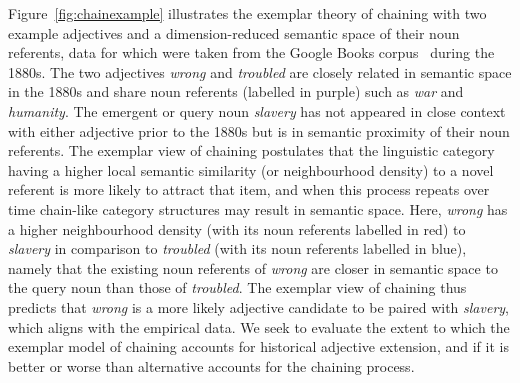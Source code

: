 \documentclass[output=paper]{langsci/langscibook}
\begin{document}
Figure~\ref{fig:chainexample} illustrates the exemplar theory of chaining with two example adjectives and a dimension-reduced semantic space of their noun referents, data for which were taken from the Google Books corpus~\citep{michel2011quantitative} during the 1880s. The two adjectives \textit{wrong} and \textit{troubled} are closely related in semantic space in the 1880s and share noun referents (labelled in purple) such as \textit{war} and \textit{humanity}. The emergent or query noun \textit{slavery} has not appeared in close context with either adjective prior to the 1880s but is in semantic proximity of their noun referents. The exemplar view of chaining postulates that the linguistic category having a higher local semantic similarity (or neighbourhood density) to a novel referent is more likely to attract that item, and when this process repeats over time chain-like category structures may result in semantic space. Here, \textit{wrong} has a higher neighbourhood density (with its noun referents labelled in red) to \textit{slavery} in comparison to \textit{troubled} (with its noun referents labelled in blue), namely that the existing noun referents of \textit{wrong} are closer in semantic space to the query noun than those of \textit{troubled}. The exemplar view of chaining thus predicts that \textit{wrong} is a more likely adjective candidate to be paired with \textit{slavery}, which aligns with the empirical data. We seek to evaluate the extent to which the exemplar model of chaining accounts for historical adjective extension, and if it is better or worse than alternative accounts for the chaining process.
\end{document}
